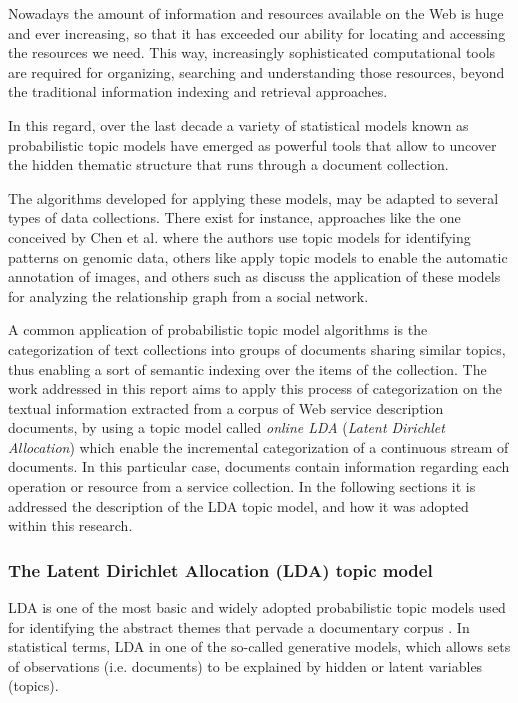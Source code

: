Nowadays the amount of information and resources available on the Web is huge and ever increasing, so that it has exceeded our ability for locating and accessing the resources we need. This way, increasingly sophisticated computational tools are required for organizing, searching and understanding those resources, beyond the traditional information indexing and retrieval approaches. 

In this regard, over the last decade a variety of statistical models known as probabilistic topic models have emerged \cite{Blei:2012} as powerful tools that allow to uncover the hidden thematic structure that runs through a document collection. 

The algorithms developed for applying these models, may be adapted to several types of data collections. There exist for instance, approaches like the one conceived by Chen et al. \cite{Chen:2012} where the authors use topic models for identifying patterns on genomic data, others like \cite{Feng:2010} apply topic models to enable the automatic annotation of images, and others such as \cite{Cha:2012} discuss the application of these models for analyzing the relationship graph from a social network. 

A common application of probabilistic topic model algorithms is the categorization of text collections into groups of documents sharing similar topics, thus enabling a sort of semantic indexing over the items of the collection. The work addressed in this report aims to apply this process of categorization on the textual information extracted from a corpus of Web service description documents, by using a topic model called \emph{online LDA} (\emph{Latent Dirichlet Allocation}) which enable the incremental categorization of a continuous stream of documents. In this particular case, documents contain information regarding each operation or resource from a service collection. In the following sections it is addressed the description of the LDA topic model, and how it was adopted within this research. 

\subsubsection{The Latent Dirichlet Allocation (LDA) topic model}
\label{subsub:The-Latent-Dirichlet}

LDA is one of the most basic and widely adopted probabilistic topic models used for identifying the abstract themes that pervade a documentary corpus \cite{Blei:2003}. In statistical terms, LDA in one of the so-called generative models, which allows sets of observations (i.e. documents) to be explained by hidden or latent variables (topics).

